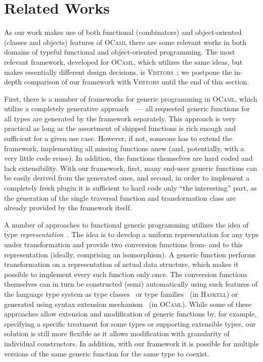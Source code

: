 \section{Related Works}

As our work makes use of both functional (combinators) and object-oriented (classes and objects) features of \textsc{OCaml} there are some relevant works
in both domains of typeful functional and object-oriented programming. The most relevant framework, developed for \textsc{OCaml}, which utilizes the same
ideas, but makes essentially different design decisions, is \textsc{Visitors}~\cite{Visitors}; we postpone the in-depth comparison of our framework with
\textsc{Visitors} until the end of this section.

First, there is a number of frameworks for generic programming in \textsc{OCaml}, which utilize a completely generative approach~\cite{Yallop,PPXLib}~---
all requested generic functions for all types are generated by the framework separately. This approach is very practical as long as the assortment
of shipped functions is rich enough and sufficient for a given use case. However, if not, someone has to extend the framework, implementing
all missing functions anew (and, potentially, with a very little code reuse). In addition, the functions themselves are hard coded and
lack extensibility. With our framework, first, many end-user generic functions can be easily derived from the generated ones, and second, in order to
implement a completely fresh plugin it is sufficient to hard code only ``the interesting'' part, as the generation of the single traversal
function and transformation class are already provided by the framework itself.

A number of approaches to functional generic programming utilizes the idea of type \emph{representation}~\cite{Hinze}.
The idea is to develop a uniform representation for any type under transformation and provide two conversion functions from- and to this representation
(ideally, comprising an isomorphism). A generic function performs transformation on a representation of actual data structure, which makes it possible to
implement every such function only once. The conversion functions themselves can in turn be constructed (semi) automatically using such features of
the language type system as type classes~\cite{Hinze,ALaCarte} or type families~\cite{InstantGenerics} (in \textsc{Haskell}) or generated using syntax extension
mechanism~\cite{GenericOCaml} (in \textsc{OCaml}). While some of these approaches allow extension and modification of generic functions by, for example, specifying a
specific treatment for some types or supporting extensible types, our solution is still more flexible as it allows modification with granularity of individual
constructors. In addition, with our framework it is possible for multiple versions of the same generic function for the same type to coexist.

